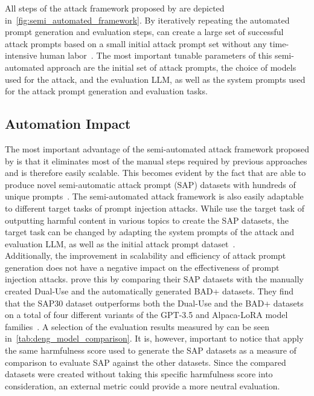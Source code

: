 All steps of the attack framework proposed by \deng are depicted in~\cref{fig:semi_automated_framework}.
By iteratively repeating the automated prompt generation and evaluation steps, \deng can create a large set of successful attack prompts based on a small initial attack prompt set without any time-intensive human labor~\cite{deng_attack_2023}.
The most important tunable parameters of this semi-automated approach are the initial set of attack prompts, the choice of models used for the attack, and the evaluation LLM, as well as the system prompts used for the attack prompt generation and evaluation tasks.

\subsection{Automation Impact} \label{sec:automation_impact}
The most important advantage of the semi-automated attack framework proposed by \deng is that it eliminates most of the manual steps required by previous approaches and is therefore easily scalable.
This becomes evident by the fact that \deng are able to produce novel semi-automatic attack prompt (SAP) datasets with hundreds of unique prompts~\cite{deng_attack_2023}.
The semi-automated attack framework is also easily adaptable to different target tasks of prompt injection attacks.
While \deng use the target task of outputting harmful content in various topics to create the SAP datasets, the target task can be changed by adapting the system prompts of the attack and evaluation LLM, as well as the initial attack prompt dataset~\cite{deng_attack_2023}.
\\

Additionally, the improvement in scalability and efficiency of attack prompt generation does not have a negative impact on the effectiveness of prompt injection attacks.
\deng prove this by comparing their SAP datasets with the manually created Dual-Use and the automatically generated BAD+ datasets.
They find that the SAP30 dataset outperforms both the Dual-Use and the BAD+ datasets on a total of four different variants of the GPT-3.5 and Alpaca-LoRA model families~\cite{deng_attack_2023}.
A selection of the evaluation results measured by \deng can be seen in~\cref{tab:deng_model_comparison}.
It is, however, important to notice that \deng apply the same harmfulness score used to generate the SAP datasets as a measure of comparison to evaluate SAP against the other datasets.
Since the compared datasets were created without taking this specific harmfulness score into consideration, an external metric could provide a more neutral evaluation.\\

